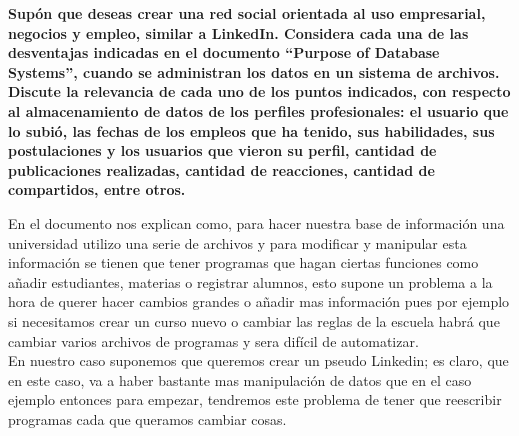 \begin{center}
\textbf{Supón que deseas crear una red social orientada al uso empresarial, negocios y empleo, similar
a LinkedIn. Considera cada una de las desventajas indicadas en el documento “Purpose of Database Systems”, cuando se administran los datos en un sistema de archivos. Discute la relevancia de cada uno de los puntos indicados, con respecto al almacenamiento de datos de los perfiles profesionales: el usuario que lo subió, las fechas de los empleos que ha tenido, sus habilidades, sus postulaciones y los usuarios que vieron su perfil, cantidad de publicaciones realizadas, cantidad de reacciones, cantidad de compartidos, entre otros.}\\
\end{center}

En el documento nos explican como, para hacer nuestra base de información una universidad utilizo una serie de archivos y para modificar y manipular esta información se tienen que tener programas que hagan ciertas funciones como añadir estudiantes, materias o registrar alumnos, esto supone un problema a la hora de querer hacer cambios grandes o añadir mas información pues por ejemplo si necesitamos crear un curso nuevo o cambiar las reglas de la escuela habrá que cambiar varios archivos de programas y sera difícil de automatizar.\\

En nuestro caso suponemos que queremos crear un pseudo Linkedin; es claro, que en este caso, va a haber bastante mas manipulación de datos que en el caso ejemplo entonces para empezar, tendremos este problema de tener que reescribir programas cada que queramos cambiar cosas.\\

